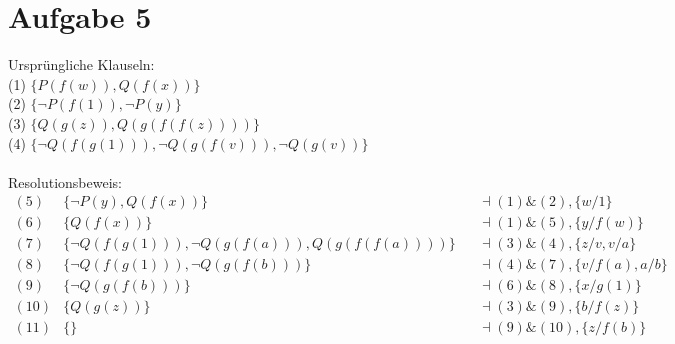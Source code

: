 \documentclass[a4paper,10pt]{article}
\begin{document}
\section*{Aufgabe 5}
Ursprüngliche Klauseln:\\
(1) $\{P(f(w)), Q(f(x))\}$\\
(2) $\{ \lnot P(f(1)), \lnot P(y) \}$\\
(3) $\{Q(g(z)), Q(g(f(f(z))))\}$\\
(4) $\{\lnot Q(f(g(1))), \lnot Q(g(f(v))), \lnot Q(g(v))\}$\\
\\
Resolutionsbeweis:\\
\begin{align*}
(5) &\{\lnot P(y), Q(f(x))\} &&\dashv (1) \& (2), \{w/1\}\\
(6) &\{Q(f(x))\} &&\dashv (1) \& (5), \{y/f(w)\}\\
(7) &\{\lnot Q(f(g(1))), \lnot Q(g(f(a))), Q(g(f(f(a))))\} &&\dashv (3) \& 		(4), \{z/v,v/a\}\\
(8) &\{\lnot Q(f(g(1))), \lnot Q(g(f(b)))\} &&\dashv (4) \& (7), \{v/f(a), 		a/b\}\\
(9) &\{\lnot Q(g(f(b)))\} &&\dashv (6) \& (8), \{x/g(1)\}\\
(10) &\{Q(g(z))\} &&\dashv (3) \& (9), \{b/f(z)\}\\
(11) &\{\} &&\dashv (9) \& (10), \{z/f(b)\}\\
\end{align*}
\end{document}
